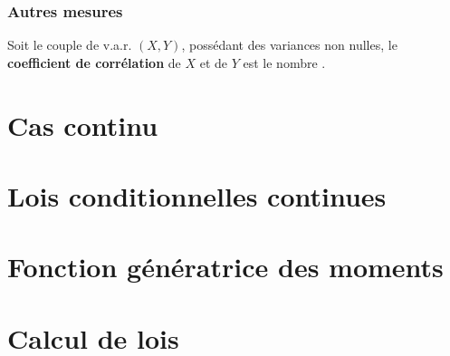 \documentclass[10pt, french]{report}
\begin{document}
\begin{multicols*}{2}
\subsubsection{Autres mesures}
\begin{definitionNOHFILL}
Soit le couple de v.a.r. $(X, Y)$, possédant des variances non nulles, le \textbf{coefficient de corrélation} de $X$ et de $Y$ est le nombre .
\end{definitionNOHFILL}



\columnbreak
\section{Cas continu}


\columnbreak
\section{Lois conditionnelles continues}


\columnbreak
\section{Fonction génératrice des moments}


\columnbreak
\section{Calcul de lois}




\end{multicols*}
\end{document}

